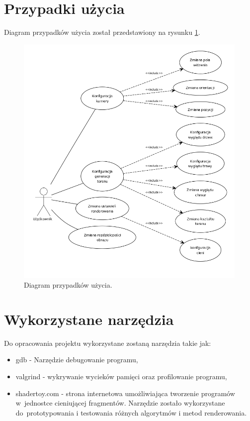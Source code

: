 \section{Przypadki użycia}
Diagram przypadków użycia został przedstawiony na rysunku \ref{fig:usecase}.
\begin{figure}[H]
\centering
\includegraphics[width=1\textwidth]{./graf/usecase.png}
\caption{Diagram przypadków użycia.}
\label{fig:usecase}
\end{figure}

\section{Wykorzystane narzędzia}

Do opracowania projektu wykorzystane zostaną narzędzia takie jak:
\begin{itemize}
\item gdb - Narzędzie  debugowanie programu,
\item valgrind - wykrywanie wycieków pamięci oraz profilowanie programu,
\item shadertoy.com - strona internetowa umożliwiająca tworzenie programów w~jednostce cieniującej fragmentów. Narzędzie zostało wykorzystane do~prototypowania i testowania różnych algorytmów i metod renderowania.
\end{itemize}

